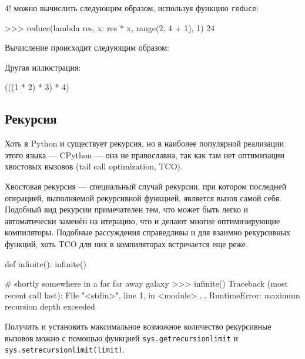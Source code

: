 $4!$ можно вычислить следующим образом, используя функцию \lstinline{reduce}:
\begin{pylst}{}{}
>>> reduce(lambda res, x: res * x, range(2, 4 + 1), 1)
24
\end{pylst}

Вычисление происходит следующим образом:
\begin{center}
\end{center}

Другая иллюстрация:
\begin{pylst}{}{}
(((1 * 2) * 3) * 4)
\end{pylst}

\subsection{Рекурсия}
Хоть в Python и существует рекурсия, но в наиболее популярной реализации этого языка --- CPython --- она не православна, так как там нет оптимизации хвостовых вызовов (tail call optimization, TCO).

Хвостовая рекурсия --- специальный случай рекурсии, при котором последней операцией, выполняемой рекурсивной функцией, является вызов самой себя. Подобный вид рекурсии примечателен тем, что может быть легко и автоматически заменён на итерацию, что и делают многие оптимизирующие компиляторы. Подобные рассуждения справедливы и для взаимно рекурсивных функций, хоть TCO для них в компиляторах встречается еще реже.

\begin{pylst}{}{}
def infinite():
    infinite()

# shortly somewhere in a far far away galaxy
>>> infinite()
Traceback (most recent call last):
  File "<stdin>", line 1, in <module>
...
RuntimeError: maximum recursion depth exceeded
\end{pylst}

Получить и установить максимальное возможное количество рекурсивные вызовов можно с помощью функцией \lstinline{sys.getrecursionlimit} и \lstinline{sys.setrecursionlimit(limit)}.

